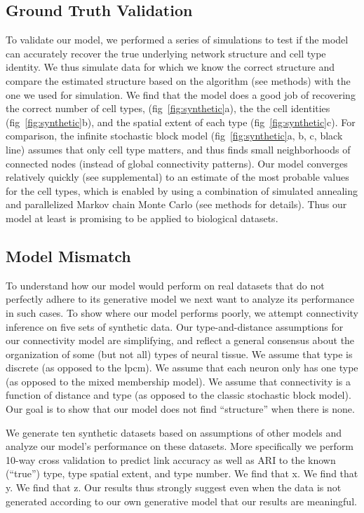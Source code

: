 \documentclass{article}
\begin{document}
\subsection{Ground Truth Validation}
To validate our model, we performed a series of simulations to test if
the model can accurately recover the true underlying network structure
and cell type identity.  We thus simulate data for which we know the
correct structure and compare the estimated structure based on the
algorithm (see methods) with the one we used for simulation. We find
that the model does a good job of recovering the correct number of
cell types, (fig~\ref{fig:synthetic}a), the the cell identities
(fig~\ref{fig:synthetic}b), and the spatial extent of each type
(fig~\ref{fig:synthetic}c).  For comparison, the infinite
stochastic block model (fig~\ref{fig:synthetic}a, b, c, black line) assumes that only cell type matters, and thus finds
small neighborhoods of connected nodes (instead of global connectivity
patterns). Our model converges relatively quickly (see supplemental) to an estimate of
the most probable values for the cell types, which is enabled by using
a combination of simulated annealing and parallelized Markov chain
Monte Carlo (see methods for details). Thus our model at least is promising to be applied to biological datasets.



\subsection{Model Mismatch}
To understand how our model would perform on real datasets that do not perfectly adhere to its generative model we next want to analyze its performance in such cases. To show where our model
performs poorly, we attempt connectivity inference on five sets of
synthetic data. Our type-and-distance assumptions for our connectivity model are
simplifying, and reflect a general consensus about the organization of
some (but not all) types of neural tissue. We assume that type is discrete (as opposed to the lpcm). We assume that each neuron only has one type (as opposed to the mixed membership model). We assume that connectivity is a function of distance and type (as opposed to the classic stochastic block model). Our goal is to show that our model does not find
``structure'' when there is none. 



We generate ten synthetic datasets based on assumptions of other models and analyze our model’s performance on these datasets. More specifically we perform 10-way cross validation to predict link accuracy as well as ARI to the known (``true'') type, type spatial extent, and type number. We find that x. We find that y. We find that z. Our results thus strongly suggest even when the data is not generated according to our own generative model that our results are meaningful.
\end{document}
